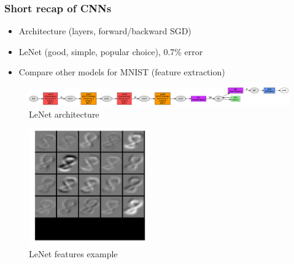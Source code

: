 \documentclass[10pt]{beamer}
\begin{document}
\begin{frame}
    \frametitle{Short recap of CNNs}
    \begin{itemize}
        \item Architecture (layers, forward/backward SGD)
        \item LeNet (good, simple, popular choice), 0.7\% error
        \item Compare other models for MNIST (feature extraction)
    \end{itemize}

    \begin{figure}[h]
        \begin{center}
            \includegraphics{midpres_figures/lenet.png}
        \end{center}
        \caption{LeNet architecture}
    \end{figure}
    \begin{figure}[h]
        \begin{center}
            \includegraphics[width=0.45\textwidth]{midpres_figures/lenet_filter8.png}
        \end{center}
        \caption{LeNet features example}
    \end{figure}
\end{frame}
\end{document}
